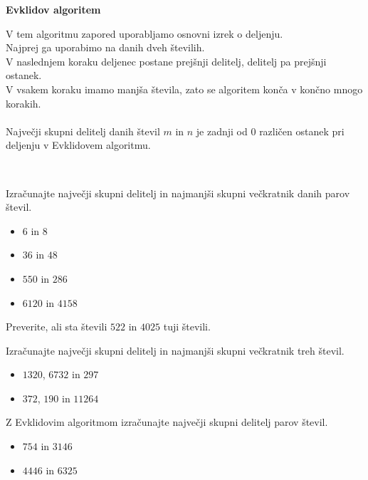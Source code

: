             \textbf{Evklidov algoritem}

                V tem algoritmu zapored uporabljamo osnovni izrek o deljenju. 
                \\ Najprej ga uporabimo na danih dveh številih.
                \\ V naslednjem koraku deljenec postane prejšnji delitelj, delitelj pa prejšnji ostanek. 
                \\ V vsakem koraku imamo manjša števila, zato se algoritem konča v končno mnogo korakih.
                \\ ~\\ Največji skupni delitelj danih števil $m$ in $n$ je zadnji od $0$ različen ostanek pri deljenju v Evklidovem algoritmu.
            

        

        ~\\
            \begin{naloga}
                Izračunajte največji skupni delitelj in najmanjši skupni večkratnik danih parov števil.
                \begin{itemize}
                    \item $6$ in $8$ 
                    \item $36$ in $48$ 
                    \item $550$ in $286$ 
                    \item $6120$ in $4158$ 
                \end{itemize}
            \end{naloga}
        
            \begin{naloga}
                Preverite, ali sta števili $522$ in $4025$ tuji števili. 
            \end{naloga}

            \begin{naloga}
                Izračunajte največji skupni delitelj in najmanjši skupni večkratnik treh števil.
                \begin{itemize}
                    \item $1320$, $6732$ in $297$ 
                    \item $372$, $190$ in $11264$ 
                \end{itemize}
            \end{naloga}
        
            \begin{naloga}
                Z Evklidovim algoritmom izračunajte največji skupni delitelj parov števil.
                \begin{itemize}
                    \item $754$ in $3146$ 
                    \item $4446$ in $6325$ 
                \end{itemize}
            \end{naloga}

